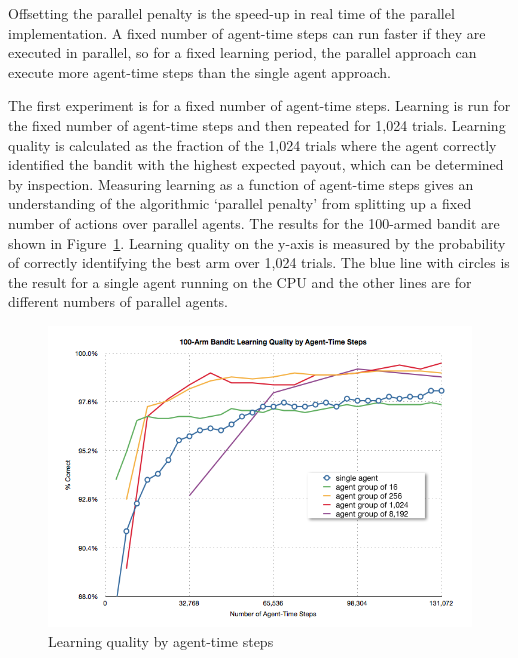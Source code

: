 \begin{flushleft}
Offsetting the parallel penalty is the speed-up in real time of the parallel implementation.  A fixed number of agent-time steps can run faster if they are executed in parallel, so for a fixed learning period, the parallel approach can execute more agent-time steps than the single agent approach.

The first experiment is for a fixed number of agent-time steps.  Learning is run for the fixed number of agent-time steps and then repeated for 1,024 trials.  Learning quality is calculated as the fraction of the 1,024 trials where the agent correctly identified the bandit with the highest expected payout, which can be determined by inspection.  Measuring learning as a function of agent-time steps gives an understanding of the algorithmic ‘parallel penalty’ from splitting up a fixed number of actions over parallel agents. The results for the 100-armed bandit are shown in Figure~\ref{fig:bandit_steps}.  Learning quality on the y-axis is measured by the probability of correctly identifying the best arm over 1,024 trials.  The blue line with circles is the result for a single agent running on the CPU and the other lines are for different numbers of parallel agents.

\end{flushleft}
\begin{figure}[hbtp]
\center
\includegraphics[scale=0.5]{fig02a}
\caption{Learning quality by agent-time steps}
\label{fig:bandit_steps}
\end{figure}

